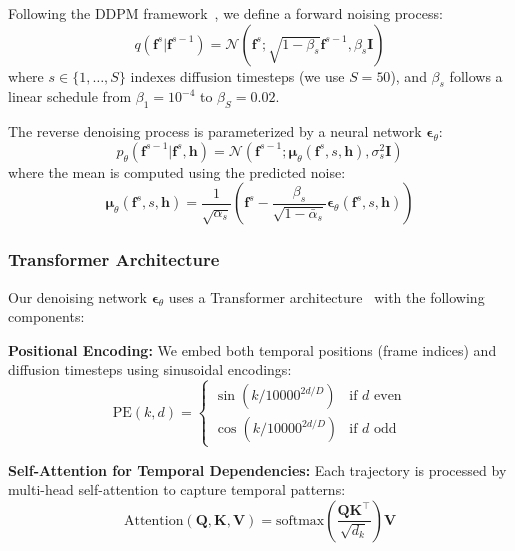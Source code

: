 \documentclass[letterpaper, 10 pt, conference]{ieeeconf}
\begin{document}
Following the DDPM framework~\cite{ho2020denoising}, we define a forward noising process:
\begin{equation}
    q(\mathbf{f}^s | \mathbf{f}^{s-1}) = \mathcal{N}(\mathbf{f}^s; \sqrt{1-\beta_s}\mathbf{f}^{s-1}, \beta_s \mathbf{I})
\end{equation}
where $s \in \{1, \ldots, S\}$ indexes diffusion timesteps (we use $S=50$), and $\beta_s$ follows a linear schedule from $\beta_1 = 10^{-4}$ to $\beta_S = 0.02$.

The reverse denoising process is parameterized by a neural network $\boldsymbol{\epsilon}_\theta$:
\begin{equation}
    p_\theta(\mathbf{f}^{s-1} | \mathbf{f}^s, \mathbf{h}) = \mathcal{N}(\mathbf{f}^{s-1}; \boldsymbol{\mu}_\theta(\mathbf{f}^s, s, \mathbf{h}), \sigma_s^2 \mathbf{I})
\end{equation}
where the mean is computed using the predicted noise:
\begin{equation}
    \boldsymbol{\mu}_\theta(\mathbf{f}^s, s, \mathbf{h}) = \frac{1}{\sqrt{\alpha_s}}\left(\mathbf{f}^s - \frac{\beta_s}{\sqrt{1-\bar{\alpha}_s}}\boldsymbol{\epsilon}_\theta(\mathbf{f}^s, s, \mathbf{h})\right)
\end{equation}

\subsubsection{Transformer Architecture}

Our denoising network $\boldsymbol{\epsilon}_\theta$ uses a Transformer architecture~\cite{vaswani2017attention} with the following components:

\textbf{Positional Encoding:} We embed both temporal positions (frame indices) and diffusion timesteps using sinusoidal encodings:
\begin{equation}
    \text{PE}(k, d) = \begin{cases}
        \sin(k / 10000^{2d/D}) & \text{if } d \text{ even} \\
        \cos(k / 10000^{2d/D}) & \text{if } d \text{ odd}
    \end{cases}
\end{equation}

\textbf{Self-Attention for Temporal Dependencies:} Each trajectory is processed by multi-head self-attention to capture temporal patterns:
\begin{equation}
    \text{Attention}(\mathbf{Q}, \mathbf{K}, \mathbf{V}) = \text{softmax}\left(\frac{\mathbf{Q}\mathbf{K}^\top}{\sqrt{d_k}}\right)\mathbf{V}
\end{equation}
\end{document}
